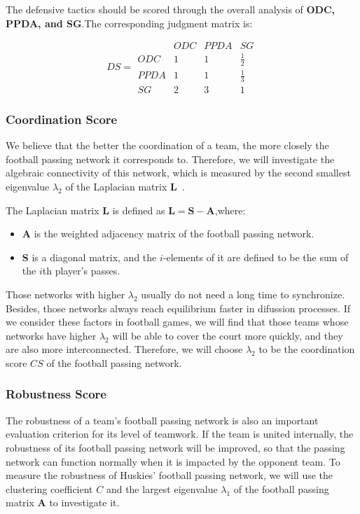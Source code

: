 \documentclass{mcmthesis}
\begin{document}
	The defensive tactics should be scored through the overall analysis of \textbf{ODC, PPDA, and SG}.The corresponding judgment matrix is:

	\begin{equation}\label{mat:3}
		DS=
	  \begin{matrix}
		& ODC & PPDA & SG\\
   		ODC & 1 & 1 & \frac{1}{2} \\
   		PPDA & 1 & 1 & \frac{1}{3} \\
   		SG & 2 & 3 & 1
  	\end{matrix}
	\end{equation}

\subsubsection{Coordination Score}
	 We believe that the better the coordination of a team, the more closely the football passing network it corresponds to.  Therefore, we will investigate the algebraic connectivity of this network, which is measured by the second smallest eigenvalue $\lambda_{2}$ of the Laplacian matrix $\textbf{L}$~\cite{First}.

	The Laplacian matrix $\textbf{L}$ is defined as $\textbf{L}=\textbf{S}-\textbf{A}$,where:
	\begin{itemize}
	\item \textbf{A} is the weighted adjacency matrix of the football passing network.
	\item \textbf{S} is a diagonal matrix, and the $i$-elements of it are defined to be the sum of the $i$th player's passes.
	\end{itemize}

	Those networks with higher  $\lambda_{2}$ usually do not need a long time to synchronize. Besides, those networks always reach equilibrium faster in difussion processes.  If we consider these factors in football games, we will find that those teams whose networks have higher $\lambda_{2}$ will be able to cover the court more quickly, and they are also more interconnected.  Therefore, we will choose $\lambda_{2}$ to be the coordination score $CS$ of the football passing network.

\subsubsection{Robustness Score}
	The robustness of a team's football passing network is also an important evaluation criterion for its level of teamwork.  If the team is united internally, the robustness of its football passing network will be improved, so that the passing network can function normally when it is impacted by the opponent team.  To measure the robustness of Huskies' football passing network, we will use the clustering coefficient $C$ and the largest eigenvalue $\lambda_{1}$ of the football passing matrix $\textbf{A}$ to investigate it.  
\end{document}
